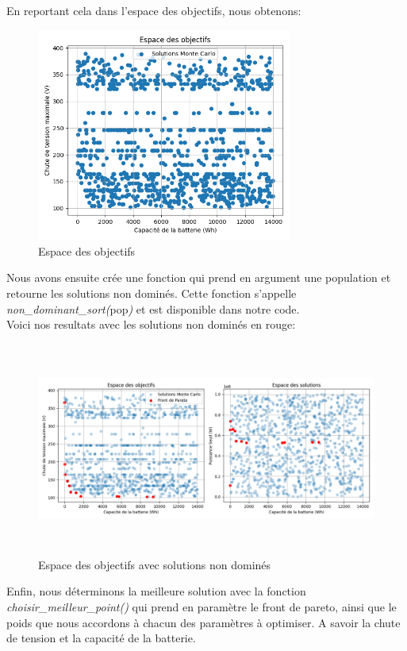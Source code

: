 \documentclass[11pt, a4paper, oneside, portrait]{report}
\begin{document}
            En reportant cela dans l'espace des objectifs, nous obtenons: 

            \begin{figure}[H]
                \centering
                \includegraphics[height=7cm]{espace_objectifs.png}
                \caption{Espace des objectifs}
            \end{figure}

            Nous avons ensuite crée une fonction qui prend en argument une population et retourne les solutions non dominés. Cette fonction s'appelle \textit{non\_dominant\_sort(}pop\textit{)} et est disponible dans notre code.\\
            
            Voici nos resultats avec les solutions non dominés en rouge: 

            \begin{figure}[H]
                \centering
                \includegraphics[height=7cm]{Monte-Carlo_pareto.png}
                \caption{Espace des objectifs avec solutions non dominés}
            \end{figure}

            Enfin, nous déterminons la meilleure solution avec la fonction \textit{choisir\_meilleur\_point()} qui prend en paramètre le front de pareto, ainsi que le poids que nous accordons à chacun des paramètres à optimiser. A savoir la chute de tension et la capacité de la batterie.\\
            
\end{document}
